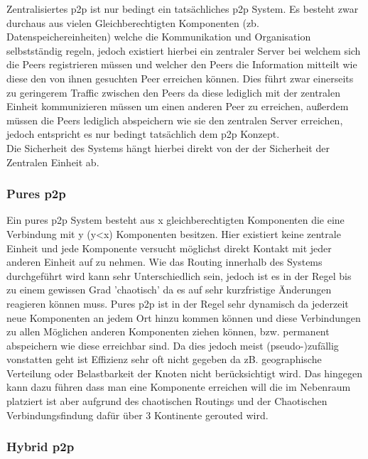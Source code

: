 \documentclass[a4paper,12pt]{scrreprt}
\begin{document}
					Zentralisiertes p2p ist nur bedingt ein tatsächliches p2p System. Es besteht zwar durchaus aus vielen Gleichberechtigten Komponenten (zb. Datenspeichereinheiten) welche die Kommunikation und Organisation selbstständig regeln, jedoch existiert hierbei ein zentraler Server bei welchem sich die Peers registrieren müssen und welcher den Peers die Information mitteilt wie diese den von ihnen gesuchten Peer erreichen können. Dies führt zwar einerseits zu geringerem Traffic zwischen den Peers da diese lediglich mit der zentralen Einheit kommunizieren müssen um einen anderen Peer zu erreichen, außerdem müssen die Peers lediglich abspeichern wie sie den zentralen Server erreichen, jedoch entspricht es nur bedingt tatsächlich dem p2p Konzept.\\
					Die Sicherheit des Systems hängt hierbei direkt von der der Sicherheit der Zentralen Einheit ab.
					
				\subsubsection{Pures p2p}
					
					Ein pures p2p System besteht aus x gleichberechtigten Komponenten die eine Verbindung mit y (y<x) Komponenten besitzen. Hier existiert keine zentrale Einheit und jede Komponente versucht möglichst direkt Kontakt mit jeder anderen Einheit auf zu nehmen. Wie das Routing innerhalb des Systems durchgeführt wird kann sehr Unterschiedlich sein, jedoch ist es in der Regel bis zu einem gewissen Grad 'chaotisch' da es auf sehr kurzfristige Änderungen reagieren können muss. Pures p2p ist in der Regel sehr dynamisch da jederzeit neue Komponenten an jedem Ort hinzu kommen können und diese Verbindungen zu allen Möglichen anderen Komponenten ziehen können, bzw. permanent abspeichern wie diese erreichbar sind. Da dies jedoch meist (pseudo-)zufällig vonstatten geht ist Effizienz sehr oft nicht gegeben da zB. geographische Verteilung oder Belastbarkeit der Knoten nicht berücksichtigt wird. Das hingegen kann dazu führen dass man eine Komponente erreichen will die im Nebenraum platziert ist aber aufgrund des chaotischen Routings und der Chaotischen Verbindungsfindung dafür über 3 Kontinente gerouted wird.
					
				\subsubsection{Hybrid p2p}
				
\end{document}
